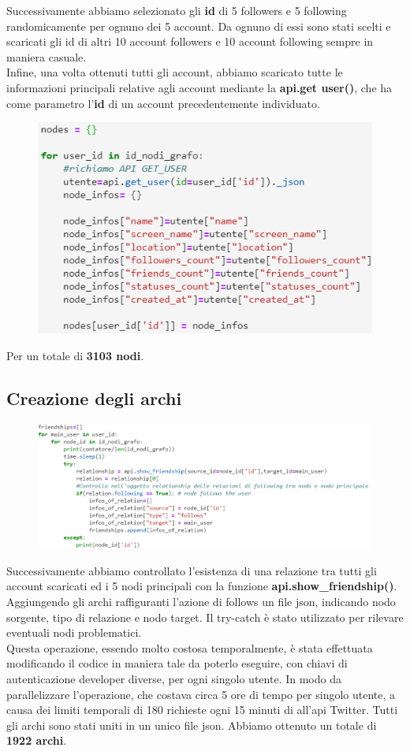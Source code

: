 \documentclass[a4paper,11pt]{report}
\begin{document}
Successivamente abbiamo selezionato gli \textbf{id} di 5 followers e 5 following randomicamente per ognuno dei 5 account. Da ognuno di essi sono stati scelti e scaricati gli id di altri 10 account followers e 10 account following sempre in maniera casuale.\\

Infine, una volta ottenuti tutti gli account, abbiamo scaricato tutte le informazioni principali relative agli account mediante la \textbf{api.get user()}, che ha come parametro l'\textbf{id} di un account precedentemente individuato.\\
\begin{figure}[ht]
	\centering
	\includegraphics[width=0.4\linewidth]{api_get_user}
	\label{fig:apigetuser}
\end{figure}

Per un totale di \textbf{3103 nodi}.
\subsection{Creazione degli archi}
\begin{figure}[h]
	\centering
	\includegraphics[width=0.8\linewidth]{api_show_friendships}
	\label{fig:apishowfriendships}
\end{figure}

Successivamente abbiamo controllato l'esistenza di una relazione tra tutti gli account scaricati ed i 5 nodi principali con la funzione \textbf{api.show\_friendship()}. Aggiungendo gli archi raffiguranti l'azione di follows un file json, indicando nodo sorgente, tipo di relazione e nodo target. Il try-catch è stato utilizzato per rilevare eventuali nodi problematici.\pagebreak \\
Questa operazione, essendo molto costosa temporalmente, è stata effettuata modificando il codice in maniera tale da poterlo eseguire, con chiavi di autenticazione developer diverse, per ogni singolo utente. In modo da parallelizzare l'operazione, che costava circa 5 ore di tempo per singolo utente, a causa dei limiti temporali di 180 richieste ogni 15 minuti di all'api Twitter. Tutti gli archi sono stati uniti in un unico file json. Abbiamo ottenuto un totale di \textbf{1922 archi}.
\end{document}
